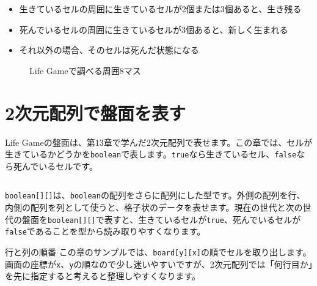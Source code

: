 \begin{itemize}
    \item 生きているセルの周囲に生きているセルが2個または3個あると、生き残る
    \item 死んでいるセルの周囲に生きているセルが3個あると、新しく生まれる
    \item それ以外の場合、そのセルは死んだ状態になる
\end{itemize}

\begin{figure}[htbp]
    \centering
    \caption{Life Gameで調べる周囲8マス}
    \label{fig:chapter18-neighbors}
\end{figure}

\section{2次元配列で盤面を表す}

Life Gameの盤面は、第13章で学んだ2次元配列で表せます。この章では、セルが生きているかどうかを\texttt{boolean}で表します。\texttt{true}なら生きているセル、\texttt{false}なら死んでいるセルです。

\begin{listing}[htbp]
\inputminted[firstline=1,lastline=38]{ts}{typescript-p5/listings/chapter18/basic-life-game.ts}
\caption{Life Gameの盤面を2次元配列で作る（\texttt{chapter18/basic-life-game.ts}）}
\label{lst:chapter18-basic-board}
\end{listing}

\texttt{boolean[][]}は、\texttt{boolean}の配列をさらに配列にした型です。外側の配列を行、内側の配列を列として使うと、格子状のデータを表せます。現在の世代と次の世代の盤面を\texttt{boolean[][]}で表すと、生きているセルが\texttt{true}、死んでいるセルが\texttt{false}であることを型から読み取りやすくなります。

\begin{notebox}{行と列の順番}
この章のサンプルでは、\texttt{board[y][x]}の順でセルを取り出します。画面の座標が\texttt{x}、\texttt{y}の順なので少し迷いやすいですが、2次元配列では「何行目か」を先に指定すると考えると整理しやすくなります。
\end{notebox}

